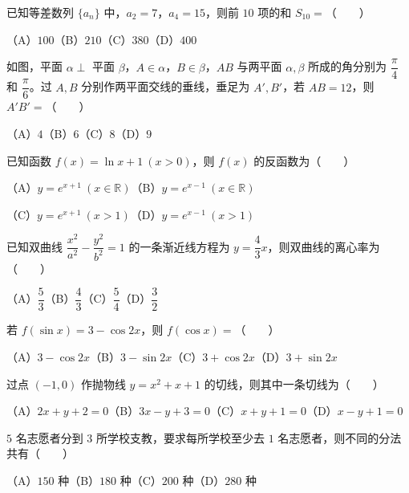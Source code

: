 \begin{question}
已知等差数列 $\{a_n\}$ 中，$a_2=7$，$a_4=15$，则前 $10$ 项的和 $S_{10}=$\mbox{（　　）}

（A）$100$\quad（B）$210$\quad（C）$380$\quad（D）$400$

\Needspace{0.4\textheight}
\end{question}
\begin{question}
如图，平面 $\alpha\perp$ 平面 $\beta$，$A\in\alpha$，$B\in\beta$，$AB$ 与两平面 $\alpha,\beta$ 所成的角分别为 $\dfrac\pi4$ 和 $\dfrac\pi6$。过 $A,B$ 分别作两平面交线的垂线，垂足为 $A',B'$，若 $AB=12$，则 $A'B'=$\mbox{（　　）}
\nopagebreak[4]
\begin{center}\end{center}
\nopagebreak[4]
（A）$4$\quad（B）$6$\quad（C）$8$\quad（D）$9$

\end{question}
\begin{question}
已知函数 $f(x)=\ln x+1\ (x>0)$，则 $f(x)$ 的反函数为\mbox{（　　）}

（A）$y=e^{x+1}\ (x\in\mathbb R)$\quad（B）$y=e^{x-1}\ (x\in\mathbb R)$

（C）$y=e^{x+1}\ (x>1)$\quad（D）$y=e^{x-1}\ (x>1)$

\end{question}
\begin{question}
已知双曲线 $\dfrac{x^2}{a^2}-\dfrac{y^2}{b^2}=1$ 的一条渐近线方程为 $y=\dfrac43x$，则双曲线的离心率为\mbox{（　　）}

（A）$\dfrac53$\quad（B）$\dfrac43$\quad（C）$\dfrac54$\quad（D）$\dfrac32$

\end{question}
\begin{question}
若 $f(\sin x)=3-\cos2x$，则 $f(\cos x)=$\mbox{（　　）}

（A）$3-\cos2x$\quad（B）$3-\sin2x$\quad（C）$3+\cos2x$\quad（D）$3+\sin2x$

\end{question}
\begin{question}
过点 $(-1,0)$ 作抛物线 $y=x^2+x+1$ 的切线，则其中一条切线为\mbox{（　　）}

（A）$2x+y+2=0$\quad（B）$3x-y+3=0$\quad（C）$x+y+1=0$\quad（D）$x-y+1=0$

\end{question}
\begin{question}
$5$ 名志愿者分到 $3$ 所学校支教，要求每所学校至少去 $1$ 名志愿者，则不同的分法共有\mbox{（　　）}

（A）$150$ 种\quad（B）$180$ 种\quad（C）$200$ 种\quad（D）$280$ 种

\end{question}

